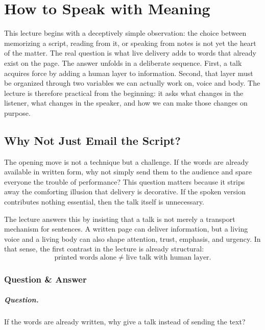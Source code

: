 \chapter{How to Speak with Meaning}

This lecture begins with a deceptively simple observation: the choice between memorizing a script, reading from it, or speaking from notes is not yet the heart of the matter. The real question is what live delivery adds to words that already exist on the page. The answer unfolds in a deliberate sequence. First, a talk acquires force by adding a human layer to information. Second, that layer must be organized through two variables we can actually work on, voice and body. The lecture is therefore practical from the beginning: it asks what changes in the listener, what changes in the speaker, and how we can make those changes on purpose.

\section{Why Not Just Email the Script?}

The opening move is not a technique but a challenge. If the words are already available in written form, why not simply send them to the audience and spare everyone the trouble of performance? This question matters because it strips away the comforting illusion that delivery is decorative. If the spoken version contributes nothing essential, then the talk itself is unnecessary.

The lecture answers this by insisting that a talk is not merely a transport mechanism for sentences. A written page can deliver information, but a living voice and a living body can also shape attention, trust, emphasis, and urgency. In that sense, the first contrast in the lecture is already structural:
\begin{equation}
\text{printed words alone} \neq \text{live talk with human layer}.
\end{equation}

\subsection{Question \& Answer}

\paragraph{Question.} If the words are already written, why give a talk instead of sending the text?

